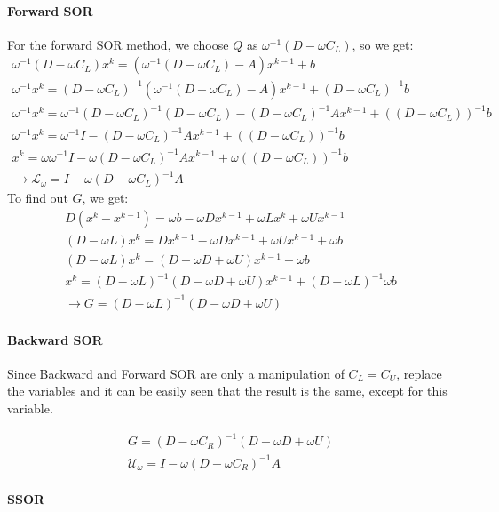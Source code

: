 \paragraph{Forward SOR}
For the forward SOR method, we choose $Q$ as $\omega^{-1}(D-\omega C_L) $, so we get:
\begin{gather*}
\omega^{-1}(D-\omega C_L) x^{k} = (\omega^{-1}(D-\omega C_L) -A) x^{k-1} + b \\
\omega^{-1} x^{k} = (D-\omega C_L)^{-1}(\omega^{-1}(D-\omega C_L) -A) x^{k-1} + (D-\omega C_L)^{-1} b \\
\omega^{-1} x^{k} = \omega^{-1}(D-\omega C_L)^{-1}(D-\omega C_L) - (D-\omega C_L)^{-1}A x^{k-1} + ((D-\omega C_L))^{-1} b \\
\omega^{-1} x^{k} = \omega^{-1}I - (D-\omega C_L)^{-1}A x^{k-1} + ((D-\omega C_L))^{-1} b \\
x^{k} = \omega \omega^{-1}I - \omega (D-\omega C_L)^{-1}A x^{k-1} + \omega((D-\omega C_L))^{-1} b \\
\rightarrow \mathcal{L_{\omega}} = I - \omega (D-\omega C_L)^{-1}A
\end{gather*}
To find out $G$, we get:
\begin{gather*}
D(x^{k} - x^{k-1}) =  \omega b - \omega D x^{k-1} + \omega L x^{k} + \omega U x^{k-1}\\
(D - \omega L) x^{k} = Dx^{k-1} -  \omega D x^{k-1} + \omega U x^{k-1} + \omega b\\
(D - \omega L) x^{k} = (D - \omega D + \omega U ) x^{k-1} + \omega b \\
x^{k} =  (D - \omega L)^{-1} (D - \omega D + \omega U ) x^{k-1} + (D - \omega L)^{-1} \omega b \\
\rightarrow G = (D - \omega L)^{-1} (D - \omega D + \omega U )
\end{gather*}
\paragraph{Backward SOR}
Since Backward and Forward SOR are only a manipulation of $C_L = C_U$, replace the variables and it can be easily seen that the result is the same, except for this variable.

\begin{gather*}
G = (D - \omega C_R)^{-1} (D - \omega D + \omega U ) \\
\mathcal{U_{\omega}} = I - \omega (D-\omega C_R)^{-1}A
\end{gather*}

\paragraph{SSOR}

